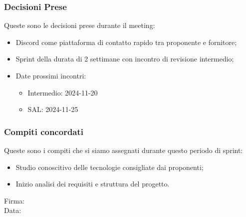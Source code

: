 \documentclass[12pt]{article}
\begin{document}
\subsubsection{Decisioni Prese}
Queste sono le decisioni prese durante il meeting:
\begin{itemize}
	\item Discord come piattaforma di contatto rapido tra proponente e fornitore;
	\item Sprint della durata di 2 settimane con incontro di revisione intermedio;
	\item Date prossimi incontri:
	\begin{itemize}
		\item Intermedio: 2024-11-20
		\item SAL: 2024-11-25
	\end{itemize}
\end{itemize}

\subsubsection{Compiti concordati}
Queste sono i compiti che si siamo assegnati durante questo periodo di sprint:
\begin{itemize}
	\item Studio conoscitivo delle tecnologie consigliate dai proponenti;
	\item Inizio analisi dei requisiti e struttura del progetto.
\end{itemize}

\vfill
\begin{minipage}{10cm}
Firma: \hrulefill \\
\vspace{2mm}
Data: \dotfill
\end{minipage}
\end{document}
